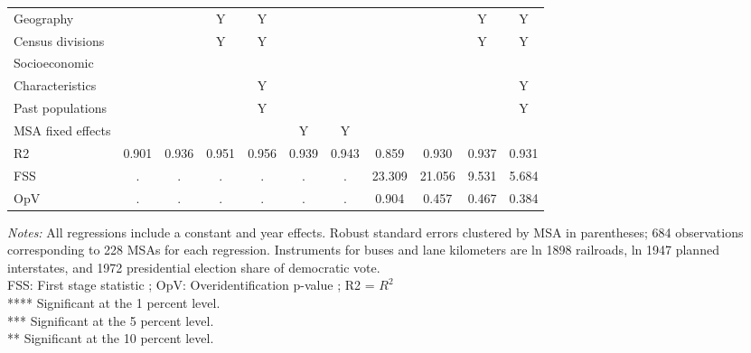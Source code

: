 \begin{table}[htbp]
\begin{tabular}{l*{10}{c}}
           Geography & & & Y & Y & & & & & Y & Y \\            Census divisions & & & Y & Y & & & & & Y & Y \\            Socioeconomic           \\Characteristics & & & & Y & & & & & & Y \\            Past populations & & & & Y & & & & & & Y \\           MSA fixed effects & & & & & Y & Y & & & & \\                 
R2                  &       0.901         &       0.936         &       0.951         &       0.956         &       0.939         &       0.943         &       0.859         &       0.930         &       0.937         &       0.931         \\
FSS                 &           .         &           .         &           .         &           .         &           .         &           .         &      23.309         &      21.056         &       9.531         &       5.684         \\
OpV                 &           .         &           .         &           .         &           .         &           .         &           .         &       0.904         &       0.457         &       0.467         &       0.384         \\
\hline\hline
\end{tabular}
\begin{flushleft}
\emph{Notes:} All regressions include a constant and year effects. Robust standard errors clustered by MSA in parentheses; 684 observations corresponding to 228 MSAs for each regression. Instruments for buses and lane kilometers are ln 1898 railroads, ln 1947 planned interstates, and 1972 presidential election share of democratic vote. \\ FSS: First stage statistic ; OpV: Overidentification p-value ; R2 = $ R^{2} $ \\         **** Significant at the 1 percent level. \\         *** Significant at the 5 percent level. \\         ** Significant at the 10 percent level.
\end{flushleft}
\end{table}
